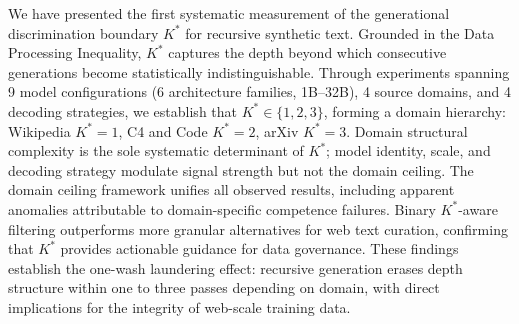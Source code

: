 \documentclass[11pt,a4paper]{article}
\newcommand{\kstar}{K^{*}}
\begin{document}
We have presented the first systematic measurement of the generational discrimination boundary $\kstar$ for recursive synthetic text.
Grounded in the Data Processing Inequality, $\kstar$ captures the depth beyond which consecutive generations become statistically indistinguishable.
Through experiments spanning 9 model configurations (6 architecture families, 1B--32B), 4 source domains, and 4 decoding strategies, we establish that $\kstar \in \{1, 2, 3\}$, forming a domain hierarchy: Wikipedia $\kstar\!=\!1$, C4 and Code $\kstar\!=\!2$, arXiv $\kstar\!=\!3$.
Domain structural complexity is the sole systematic determinant of $\kstar$; model identity, scale, and decoding strategy modulate signal strength but not the domain ceiling.
The domain ceiling framework unifies all observed results, including apparent anomalies attributable to domain-specific competence failures.
Binary $\kstar$-aware filtering outperforms more granular alternatives for web text curation, confirming that $\kstar$ provides actionable guidance for data governance.
These findings establish the one-wash laundering effect: recursive generation erases depth structure within one to three passes depending on domain, with direct implications for the integrity of web-scale training data.



\end{document}
